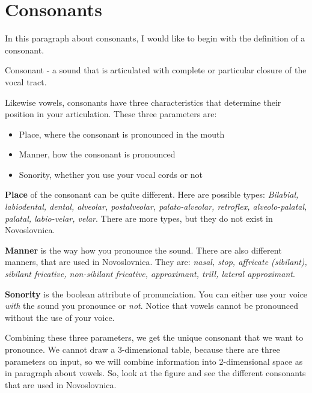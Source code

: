 \section{Consonants}

In this paragraph about consonants, I would like to begin with the definition of a consonant.

Consonant - a sound that is articulated with complete or particular closure of the vocal tract. 

Likewise vowels, consonants have three characteristics that determine their position in your articulation. These three parameters are:

\begin{itemize}
	\item{Place, where the consonant is pronounced in the mouth}
	\item{Manner, how the consonant is pronounced }
	\item{Sonority, whether you use your vocal cords or not}
\end{itemize}

\textbf{Place} of the consonant can be quite different. Here are possible types: \textit{Bilabial, labiodental, dental, alveolar, postalveolar, palato-alveolar, retroflex, alveolo-palatal, palatal, labio-velar, velar}. There are more types, but they do not exist in Novoslovnica.

\textbf{Manner} is the way how you pronounce the sound. There are also different manners, that are used in Novoslovnica. They are: \textit{nasal, stop, affricate (sibilant), sibilant fricative, non-sibilant fricative, approximant, trill, lateral approximant}.

\textbf{Sonority} is the boolean attribute of pronunciation. You can either use your voice \textit{with} the sound you pronounce or \textit{not}. Notice that vowels cannot be pronounced without the use of your voice. 

Combining these three parameters, we get the unique consonant that we want to pronounce. We cannot draw  a 3-dimensional table, because there are three parameters on input, so we will combine information into 2-dimensional space as in paragraph about vowels. So, look at the figure and see the different consonants that are used in Novoslovnica.

